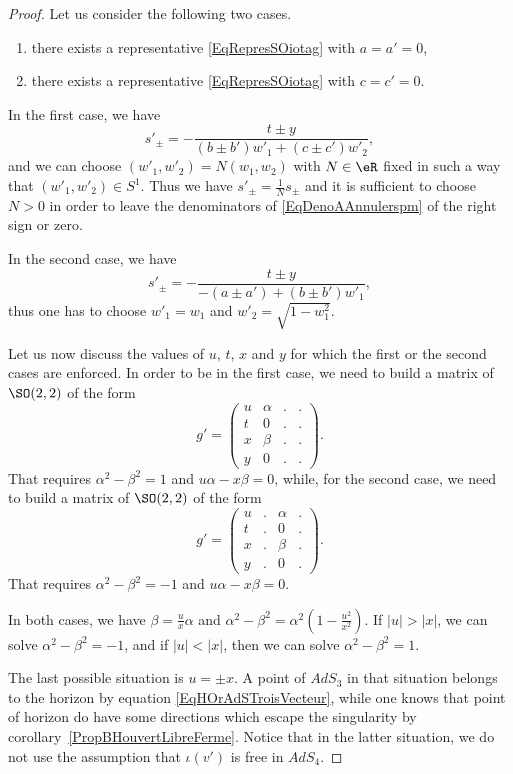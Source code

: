 \begin{proof}
Let us consider the following two cases.
\begin{enumerate}
\item
there exists a representative \eqref{EqRepresSOiotag} with $a=a'=0$,
\item
there exists a representative \eqref{EqRepresSOiotag} with $c=c'=0$.
\end{enumerate}
In the first case, we have
\begin{equation}		\label{EqDenoAAnnulerspm}
	s'_{\pm}=-\frac{ t\pm y }{ (b\pm b')w'_1+(c\pm c')w'_2 },
\end{equation}
and we can choose $(w'_1,w'_2)=N(w_1,w_2)$ with $N\in\eR$ fixed in such a way that $(w'_1,w'_2)\in S^1$. Thus we have $s'_{\pm}=\frac{1}{ N }s_{\pm}$ and it is sufficient to choose $N>0$ in order to leave the denominators of \eqref{EqDenoAAnnulerspm} of the right sign or zero.

In the second case, we have
\begin{equation}
	s'_{\pm}=-\frac{ t\pm y }{ -(a\pm a')+(b\pm b')w'_1 },
\end{equation}
thus one has to choose $w'_1=w_1$ and $w'_2=\sqrt{1-w_1^2}$.

Let us now discuss the values of $u$, $t$, $x$ and $y$ for which the first or the second cases are enforced. In order to be in the first case, we need to build a matrix of $\SO(2,2)$ of the form
\begin{equation}
	g'=\begin{pmatrix}
 u	&	\alpha	&	.	&	.	\\
 t	&	0	&	.	&	.	\\
 x	&	\beta	&	.	&	.	\\
 y	&	0	&	.	&	.
 \end{pmatrix}.
\end{equation}
That requires $\alpha^2-\beta^2=1$ and $u\alpha-x\beta=0$, while, for the second case, we need to build a matrix of $\SO(2,2)$ of the form
\begin{equation}
	g'=\begin{pmatrix}
 u	&	.	&	\alpha	&	.	\\
 t	&	.	&	0	&	.	\\
 x	&	.	&	\beta	&	.	\\
 y	&	.	&	0	&	.
 \end{pmatrix}.
\end{equation}
That requires $\alpha^2-\beta^2=-1$ and $u\alpha-x\beta=0$.

In both cases, we have $\beta=\frac{ u }{ x }\alpha$ and $\alpha^2-\beta^2=\alpha^2\left( 1-\frac{ u^2 }{ x^2 } \right)$. If $| u |>| x |$, we can solve $\alpha^2-\beta^2=-1$, and if $| u |<| x |$, then we can solve $\alpha^2-\beta^2=1$.

The last possible situation is $u=\pm x$. A point of $AdS_3$ in that situation belongs to the horizon by equation \eqref{EqHOrAdSTroisVecteur}, while one knows that point of horizon do have some directions which escape the singularity by corollary~\ref{PropBHouvertLibreFerme}. Notice that in the latter situation, we do not use the assumption that $\iota(v')$ is free in $AdS_4$.
\end{proof}

